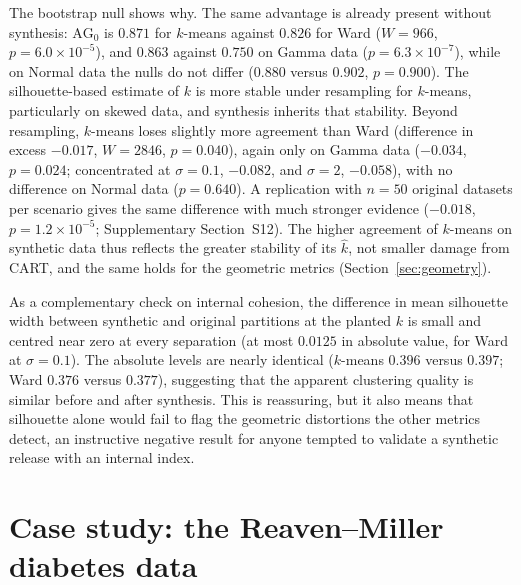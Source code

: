 \documentclass[pdflatex,referee]{sn-jnl}
\begin{document}
The bootstrap null shows why. The same advantage is already present without
synthesis: $\mathrm{AG}_0$ is $0.871$ for $k$-means against $0.826$ for Ward
($W = 966$, $p = 6.0 \times 10^{-5}$), and $0.863$ against $0.750$ on Gamma
data ($p = 6.3 \times 10^{-7}$), while on Normal data the nulls do not differ
($0.880$ versus $0.902$, $p = 0.900$). The silhouette-based estimate of $k$ is
more stable under resampling for $k$-means, particularly on skewed data, and
synthesis inherits that stability. Beyond resampling, $k$-means loses slightly
more agreement than Ward (difference in excess $-0.017$, $W = 2846$,
$p = 0.040$), again only on Gamma data ($-0.034$, $p = 0.024$; concentrated at
$\sigma = 0.1$, $-0.082$, and $\sigma = 2$, $-0.058$), with no difference on Normal data ($p = 0.640$). A replication with $n = 50$
original datasets per scenario gives the same difference with much stronger
evidence ($-0.018$, $p = 1.2 \times 10^{-5}$; Supplementary Section~S12). The higher agreement of $k$-means on
synthetic data thus reflects the greater stability of its $\hat{k}$, not
smaller damage from CART, and the same holds for the geometric metrics
(Section~\ref{sec:geometry}).

As a complementary check on internal cohesion, the difference in mean
silhouette width between synthetic and original partitions at the planted $k$
is small and centred near zero at every separation (at most $0.0125$ in
absolute value, for Ward at $\sigma = 0.1$). The absolute levels are nearly
identical ($k$-means $0.396$ versus $0.397$; Ward $0.376$ versus $0.377$),
suggesting that the apparent clustering quality is similar before and after
synthesis. This is reassuring, but it also means that silhouette alone would
fail to flag the geometric distortions the other metrics detect, an
instructive negative result for anyone tempted to validate a synthetic release
with an internal index.

\section{Case study: the Reaven--Miller diabetes data}\label{sec:case}
\end{document}
